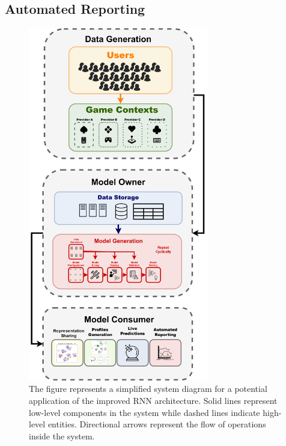 \subsection{Automated Reporting}
\lorem

\begin{figure}[ht]
\centering
\includegraphics[width=0.7\textwidth]{images/chapter_5/pipeline_diagram.png}
\caption[\textbf{Model Deployment Pipeline}]{The figure represents a simplified system diagram for a potential application of the improved RNN architecture. Solid lines represent low-level components in the system while dashed lines indicate high-level entities. Directional arrows represent the flow of operations inside the system.}
\label{pipeline}
\end{figure}